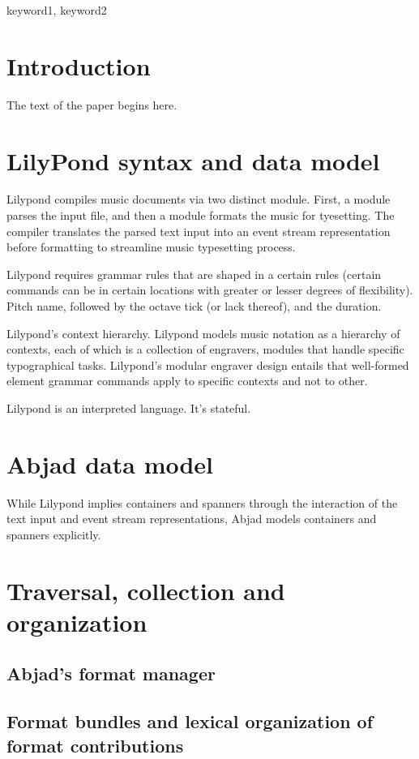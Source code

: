 \documentclass{sigplanconf}
\begin{document}
\keywords
keyword1, keyword2

\section{Introduction}

The text of the paper begins here.

\section{LilyPond syntax and data model}
Lilypond compiles music documents via two distinct module. First, a module parses the input
file, and then a module formats the music for tyesetting. The compiler translates the parsed text input into an event stream representation before formatting to streamline music typesetting process.\cite{sandberg2006separating}

Lilypond requires grammar rules that are shaped in a certain rules (certain commands can be in certain locations with greater or lesser degrees of flexibility). Pitch name, followed by the octave tick (or lack thereof), and the duration.

Lilypond's context hierarchy. Lilypond models music notation as a hierarchy of contexts, each of which is a collection of engravers, modules that handle specific typographical tasks. Lilypond's modular engraver design entails that well-formed element grammar commands apply to specific contexts and not to other.

Lilypond is an interpreted language. It's stateful.

\section{Abjad data model}
While Lilypond implies containers and spanners through the interaction of the text input and event stream representations, Abjad models containers and spanners explicitly.

\section{Traversal, collection and organization}

\subsection{Abjad's format manager}

\subsection{Format bundles and lexical organization of format contributions}
\end{document}
